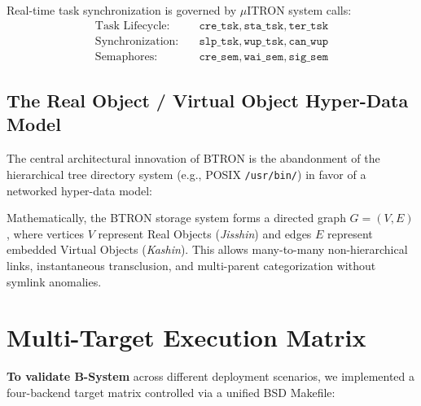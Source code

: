 \documentclass[10pt,journal,compsoc,twocolumn]{article}
\newcommand{\ja}[1]{\begin{CJK*}{UTF8}{min}#1\end{CJK*}}
\begin{document}
Real-time task synchronization is governed by $\mu$ITRON system calls:
\begin{align}
\text{Task Lifecycle:} \quad & \texttt{cre\_tsk}, \texttt{sta\_tsk}, \texttt{ter\_tsk} \\
\text{Synchronization:} \quad & \texttt{slp\_tsk}, \texttt{wup\_tsk}, \texttt{can\_wup} \\
\text{Semaphores:} \quad & \texttt{cre\_sem}, \texttt{wai\_sem}, \texttt{sig\_sem}
\end{align}

\subsection{The Real Object / Virtual Object Hyper-Data Model}
The central architectural innovation of BTRON is the abandonment of the hierarchical tree directory system (e.g., POSIX \texttt{/usr/bin/}) in favor of a networked hyper-data model:


Mathematically, the BTRON storage system forms a directed graph $G = (V, E)$, where vertices $V$ represent Real Objects (\emph{Jisshin}) and edges $E$ represent embedded Virtual Objects (\emph{Kashin}). This allows many-to-many non-hierarchical links, instantaneous transclusion, and multi-parent categorization without symlink anomalies.

\section{Multi-Target Execution Matrix}
\label{sec:execution_matrix}

\textbf{To validate B-System} across different deployment scenarios, we implemented a four-backend target matrix controlled via a unified BSD Makefile:
\end{document}

